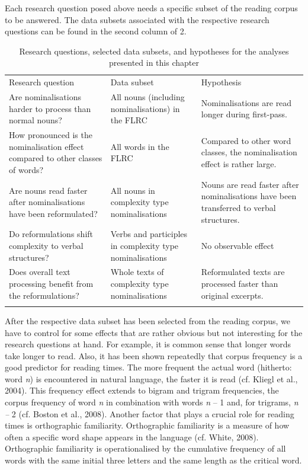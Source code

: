 \documentclass[output=paper]{langsci/langscibook}
\begin{document}
Each research question posed above needs a specific subset of the reading corpus to be answered. The data subsets associated with the respective research questions can be found in the second column of 2.

\begin{table}
\begin{tabular}{lll}
\lsptoprule
 Research question & Data subset & Hypothesis\\
 Are nominalisations harder to process than normal nouns? & All nouns (including nominalisations) in the FLRC & Nominalisations are read longer during first-pass.\\
 How pronounced is the nominalisation effect compared to other classes of words? & All words in the FLRC & Compared to other word classes, the nominalisation effect is rather large.\\
 Are nouns read faster after nominalisations have been reformulated? & All nouns in complexity type nominalisations & Nouns are read faster after nominalisations have been transferred to verbal structures.\\
 Do reformulations shift complexity to verbal structures? & Verbs and participles in complexity type nominalisations & No observable effect\\
 Does overall text processing benefit from the reformulations? & Whole texts of complexity type nominalisations & Reformulated texts are processed faster than original excerpts.\\
\lspbottomrule
\end{tabular}
\caption{Research questions, selected data subsets, and hypotheses for the analyses presented in this chapter}
\label{tab:2}
\end{table}
After the respective data subset has been selected from the reading corpus, we have to control for some effects that are rather obvious but not interesting for the research questions at hand. For example, it is common sense that longer words take longer to read. Also, it has been shown repeatedly that corpus frequency is a good predictor for reading times. The more frequent the actual word (hitherto: word \textit{n}) is encountered in natural language, the faster it is read (cf. Kliegl et al., 2004). This frequency effect extends to bigram and trigram frequencies, the corpus frequency of word \textit{n }in combination with words \textit{n }– 1 and, for trigrams, \textit{n – }2 (cf. Boston et al., 2008). Another factor that plays a crucial role for reading times is orthographic familiarity. Orthographic familiarity is a measure of how often a specific word shape appears in the language (cf. White, 2008). Orthographic familiarity is operationalised by the cumulative frequency of all words with the same initial three letters and the same length as the critical word. 
\end{document}
